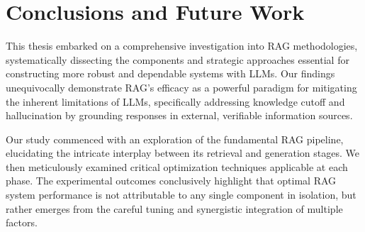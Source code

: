 \chapter{Conclusions and Future Work}
\label{chap:conclusions}

This thesis embarked on a comprehensive investigation into RAG methodologies, systematically dissecting the components and strategic approaches essential for constructing more robust and dependable systems with LLMs. Our findings unequivocally demonstrate RAG's efficacy as a powerful paradigm for mitigating the inherent limitations of LLMs, specifically addressing knowledge cutoff and hallucination by grounding responses in external, verifiable information sources.

Our study commenced with an exploration of the fundamental RAG pipeline, elucidating the intricate interplay between its retrieval and generation stages. We then meticulously examined critical optimization techniques applicable at each phase. The experimental outcomes conclusively highlight that optimal RAG system performance is not attributable to any single component in isolation, but rather emerges from the careful tuning and synergistic integration of multiple factors. 

